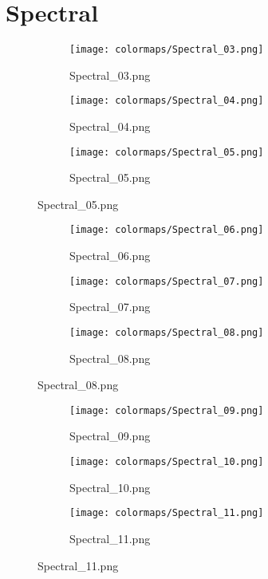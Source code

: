 \documentclass{article}%
\begin{document}
%
\newpage%
\section{Spectral}%
\label{sec:Spectral}%
\hspace{1cm}\hfill%
\hspace{1cm}\hfill%
\hspace{1cm}\hfill%


\begin{figure}[h!]%
\begin{subfigure}[b]{0.3\linewidth}%
\texttt{[image: colormaps/Spectral\_03.png]}%
\caption{Spectral\_03.png}%
\end{subfigure}%
\begin{subfigure}[b]{0.3\linewidth}%
\texttt{[image: colormaps/Spectral\_04.png]}%
\caption{Spectral\_04.png}%
\end{subfigure}%
\begin{subfigure}[b]{0.3\linewidth}%
\texttt{[image: colormaps/Spectral\_05.png]}%
\caption{Spectral\_05.png}%
\end{subfigure}%
\end{figure}

%
\hspace{1cm}\hfill%
\hspace{1cm}\hfill%
\hspace{1cm}\hfill%


\begin{figure}[h!]%
\begin{subfigure}[b]{0.3\linewidth}%
\texttt{[image: colormaps/Spectral\_06.png]}%
\caption{Spectral\_06.png}%
\end{subfigure}%
\begin{subfigure}[b]{0.3\linewidth}%
\texttt{[image: colormaps/Spectral\_07.png]}%
\caption{Spectral\_07.png}%
\end{subfigure}%
\begin{subfigure}[b]{0.3\linewidth}%
\texttt{[image: colormaps/Spectral\_08.png]}%
\caption{Spectral\_08.png}%
\end{subfigure}%
\end{figure}

%
\hspace{1cm}\hfill%
\hspace{1cm}\hfill%
\hspace{1cm}\hfill%


\begin{figure}[h!]%
\begin{subfigure}[b]{0.3\linewidth}%
\texttt{[image: colormaps/Spectral\_09.png]}%
\caption{Spectral\_09.png}%
\end{subfigure}%
\begin{subfigure}[b]{0.3\linewidth}%
\texttt{[image: colormaps/Spectral\_10.png]}%
\caption{Spectral\_10.png}%
\end{subfigure}%
\begin{subfigure}[b]{0.3\linewidth}%
\texttt{[image: colormaps/Spectral\_11.png]}%
\caption{Spectral\_11.png}%
\end{subfigure}%
\end{figure}
\end{document}
